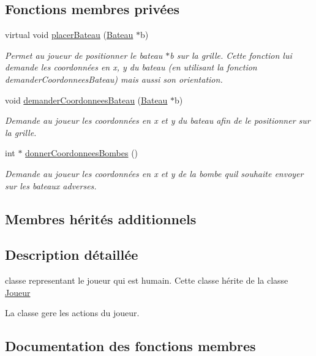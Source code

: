 \subsection*{Fonctions membres privées}
\begin{DoxyCompactItemize}
\item 
virtual void \hyperlink{class_joueur_humain_af9e3ccafc7cde958dda81551d0ef6abd}{placer\+Bateau} (\hyperlink{class_bateau}{Bateau} $\ast$b)
\begin{DoxyCompactList}\small\item\em Permet au joueur de positionner le bateau {\ttfamily $\ast$b} sur la grille. Cette fonction lui demande les coordonnées en x, y du bateau (en utilisant la fonction demander\+Coordonnees\+Bateau) mais aussi son orientation. \end{DoxyCompactList}\item 
void \hyperlink{class_joueur_humain_ad176fe72c1265d67cfc99779c044b85d}{demander\+Coordonnees\+Bateau} (\hyperlink{class_bateau}{Bateau} $\ast$b)
\begin{DoxyCompactList}\small\item\em Demande au joueur les coordonnées en x et y du bateau afin de le positionner sur la grille. \end{DoxyCompactList}\item 
int $\ast$ \hyperlink{class_joueur_humain_a7f3de788931d83526b09626814b9b046}{donner\+Coordonnees\+Bombes} ()
\begin{DoxyCompactList}\small\item\em Demande au joueur les coordonnées en x et y de la bombe qu\textquotesingle{}il souhaite envoyer sur les bateaux adverses. \end{DoxyCompactList}\end{DoxyCompactItemize}
\subsection*{Membres hérités additionnels}


\subsection{Description détaillée}
classe representant le joueur qui est humain. Cette classe hérite de la classe \hyperlink{class_joueur}{Joueur} 

La classe gere les actions du joueur. 

\subsection{Documentation des fonctions membres}
